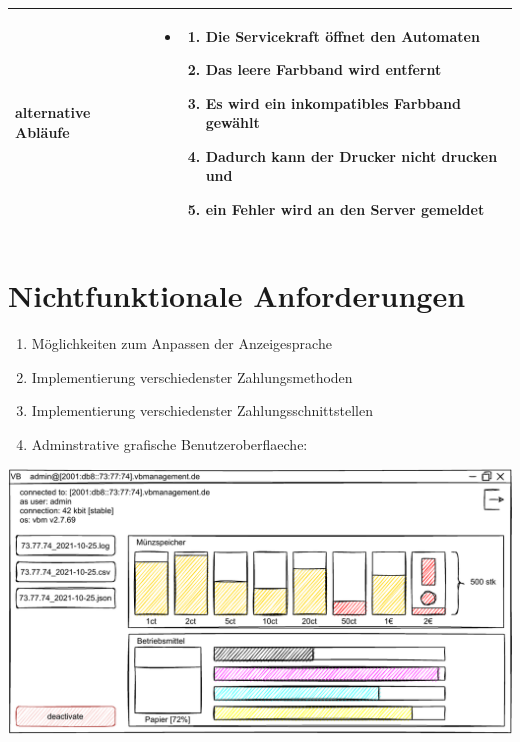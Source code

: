 \documentclass{article}
\begin{document}
\begin{tabularx}{\textwidth}{|l|X|}
        \textbf{alternative Abläufe} & \begin{itemize}
            \item \begin{enumerate}
                \item Die Servicekraft öffnet den Automaten
                \item Das leere Farbband wird entfernt
                \item Es wird ein inkompatibles Farbband gewählt
                \item Dadurch kann der Drucker nicht drucken und
                \item ein Fehler wird an den Server gemeldet
            \end{enumerate}
        \end{itemize} \\\hline
    \end{tabularx}

    \section{Nichtfunktionale Anforderungen}
    \begin{enumerate}[font={\bfseries}, label={NFRQ\arabic*:}]
        \setlength\itemsep{-0.25em}
        \item Möglichkeiten zum Anpassen der \gls{Anzeigesprache}
        \item Implementierung verschiedenster \gls{Zahlungsmethoden}
        \item Implementierung verschiedenster \gls{Zahlungsschnittstellen}
        \item Adminstrative grafische \gls{Benutzeroberflaeche}:
    \end{enumerate}
    \includegraphics[width=\textwidth]{swt_wende_tim_h03_gui.pdf}

    \clearpage
    \printnoidxglossaries
\end{document}
